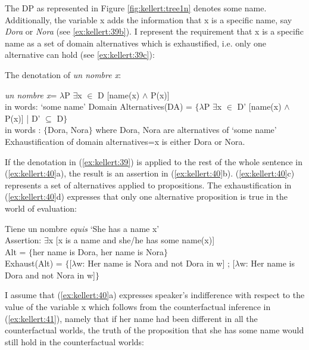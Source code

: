 \documentclass[output=paper]{langsci/langscibook}
\begin{document}
The DP as represented in Figure \ref{fig:kellert:tree1n} denotes some name. Additionally, the variable x adds the information that x is a specific name, say \textit{Dora} or \textit{Nora} (see \ref{ex:kellert:39b}). I represent the requirement that x is a specific name as a set of domain alternatives which is exhaustified, i.e. only one alternative can hold (see \ref{ex:kellert:39c}):

\ea\label{ex:kellert:39} The denotation of \textit{un nombre x}:
\begin{xlist}
\ex\label{ex:kellert:39a}
{\textlbrackdbl \textit{un nombre x}\textrbrackdbl = $\lambda$P $\exists$x $\in$ D [name(x) $\wedge$ P(x)]}\\
in words: ‘some name’
\ex\label{ex:kellert:39b}
{Domain Alternatives(DA) = $\lbrace$$\lambda$P $\exists$x $\in$ D’ [name(x) $\wedge$ P(x)] | D’ $\subseteq$ D$\rbrace$}\\
in words : $\lbrace$Dora, Nora$\rbrace$ where Dora, Nora are alternatives of ‘some name’
\ex\label{ex:kellert:39c}
Exhaustification of domain alternatives=x is either Dora or Nora.
\end{xlist}
\z

If the denotation in (\ref{ex:kellert:39}) is applied to the rest of the whole sentence in (\ref{ex:kellert:40}a), the result is an assertion in (\ref{ex:kellert:40}b). (\ref{ex:kellert:40}c) represents a set of alternatives applied to propositions. The exhaustification in (\ref{ex:kellert:40}d) expresses that only one alternative proposition is true in the world of evaluation:

\ea\label{ex:kellert:40}
\begin{xlist}
\ex Tiene un nombre \textit{equis}  ‘She has a name x’\\
\ex Assertion: $\exists$x [x is a name and she/he has some name(x)]\\
\ex Alt = $\lbrace$her name is Dora, her name is Nora$\rbrace$\\
\ex Exhaust(Alt) = $\lbrace${[}$\lambda$w: Her name is Nora and not Dora in w{]} ; {[}$\lambda$w: Her name is Dora and not Nora in w{]}$\rbrace$\\
\end{xlist}
\z

I assume that (\ref{ex:kellert:40}a) expresses speaker's indifference with respect to the value of the variable x which follows from the counterfactual inference in (\ref{ex:kellert:41}), namely that if her name had been different in all the counterfactual worlds, the truth of the proposition that she has some name would still hold in the counterfactual worlds:
\end{document}

